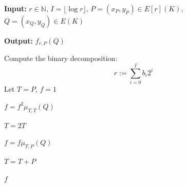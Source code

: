 \documentclass[12pt,a4paper]{report}
\begin{document}
\newpage
	\begin{algorithm}
		\caption{Miller's algorithm (general version)}

		\textbf{Input:}
		$r \in \mathbb{N}$,
		$I=\lfloor \log r \rfloor$,
		$P=(x_P,y_P)\in E[r](K)$,
		$Q=(x_Q,y_Q)\in E(K)$

		\vspace{0.2cm}

		\textbf{Output:}
		$f_{r,P}(Q)$

		\begin{algorithmic}[1]

		\State Compute the binary decomposition:
		\[
		r := \sum_{i=0}^{I} b_i 2^i
		\]
		Let $T=P$, $f=1$


		    \State $f = f^2 \mu_{T,T}(Q)$
    
		    \State $T = 2T$
    
    
		        \State $f = f \mu_{T,P}(Q)$
        
		        \State $T = T + P$
        
		    \EndIf
    
		\EndFor

		\State \Return $f$

		\end{algorithmic}
	\end{algorithm}
\newpage
\end{document}
